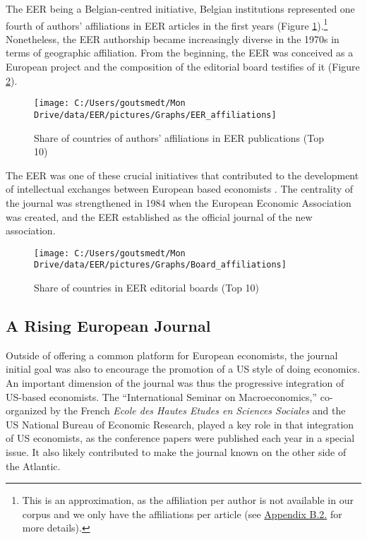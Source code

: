 \documentclass[]{elsarticle} %
\begin{document}
The EER being a Belgian-centred initiative, Belgian institutions
represented one fourth of authors' affiliations in EER articles in the
first years (Figure \ref{fig:plot-authors}).\footnote{This is an
  approximation, as the affiliation per author is not available in our
  corpus and we only have the affiliations per article (see
  \protect\hyperlink{author-affiliation}{Appendix B.2.} for more
  details).} Nonetheless, the EER authorship became increasingly diverse
in the 1970s in terms of geographic affiliation. From the beginning, the
EER was conceived as a European project and the composition of the
editorial board testifies of it (Figure \ref{fig:plot-boards}).

\begin{figure}[h]

{\centering \texttt{[image: C:/Users/goutsmedt/Mon Drive/data/EER/pictures/Graphs/EER\_affiliations]} 

}

\caption{Share of countries of authors' affiliations in EER publications (Top 10)}\label{fig:plot-authors}
\end{figure}

The EER was one of these crucial initiatives that contributed to the
development of intellectual exchanges between European based economists
\citep{goutsmedt2021}. The centrality of the journal was strengthened in
1984 when the European Economic Association was created, and the EER
established as the official journal of the new association.

\begin{figure}[h]

{\centering \texttt{[image: C:/Users/goutsmedt/Mon Drive/data/EER/pictures/Graphs/Board\_affiliations]} 

}

\caption{Share of countries in EER editorial boards (Top 10)}\label{fig:plot-boards}
\end{figure}

\hypertarget{rising-journal}{%
\subsection{A Rising European Journal}\label{rising-journal}}

Outside of offering a common platform for European economists, the
journal initial goal was also to encourage the promotion of a US style
of doing economics. An important dimension of the journal was thus the
progressive integration of US-based economists. The ``International
Seminar on Macroeconomics,'' co-organized by the French \emph{Ecole des
Hautes Etudes en Sciences Sociales} and the US National Bureau of
Economic Research, played a key role in that integration of US
economists, as the conference papers were published each year in a
special issue. It also likely contributed to make the journal known on
the other side of the Atlantic.
\end{document}
